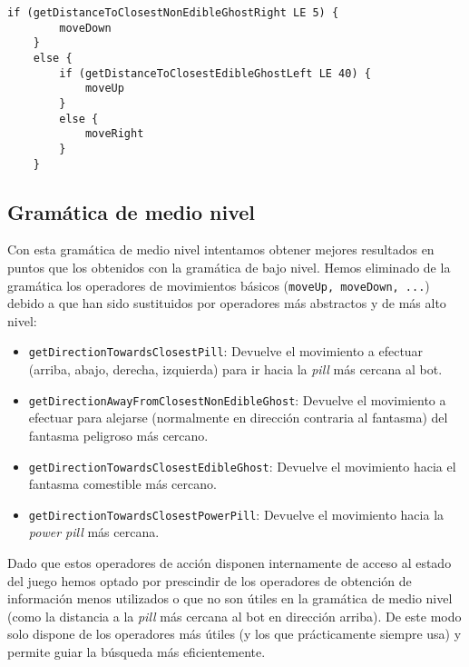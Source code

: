 \begin{lstlisting}[frame=single, breaklines=no, basicstyle=\fontsize{10}{11}\ttfamily, caption=Mejor individuo producido usando la gramática de bajo nivel evolucionado jugando contra Legacy Ghosts]
    if (getDistanceToClosestNonEdibleGhostRight LE 5) {
        moveDown
    }
    else {
        if (getDistanceToClosestEdibleGhostLeft LE 40) {
            moveUp
        }
        else {
            moveRight
        }
    }
\end{lstlisting}

\subsection{Gramática de medio nivel}
Con esta gramática de medio nivel intentamos obtener mejores resultados en puntos que los obtenidos con la gramática de bajo nivel. Hemos eliminado de la gramática los operadores de movimientos básicos (\texttt{moveUp, moveDown, ...}) debido a que han sido sustituidos por operadores más abstractos y de más alto nivel:
\begin{itemize}
\item \texttt{getDirectionTowardsClosestPill}: Devuelve el movimiento a efectuar (arriba, abajo, derecha, izquierda) para ir hacia la \textit{pill} más cercana al bot.

\item \texttt{getDirectionAwayFromClosestNonEdibleGhost}: Devuelve el movimiento a efectuar para alejarse (normalmente en dirección contraria al fantasma) del fantasma peligroso más cercano.

\item \texttt{getDirectionTowardsClosestEdibleGhost}: Devuelve el movimiento hacia el fantasma comestible más cercano.

\item \texttt{getDirectionTowardsClosestPowerPill}: Devuelve el movimiento hacia la \textit{power pill} más cercana.
\end{itemize}

Dado que estos operadores de acción disponen internamente de acceso al estado del juego hemos optado por prescindir de los operadores de obtención de información menos utilizados o que no son útiles en la gramática de medio nivel (como la distancia a la \textit{pill} más cercana al bot en dirección arriba). De este modo solo dispone de los operadores más útiles (y los que prácticamente siempre usa) y permite guiar la búsqueda más eficientemente.


